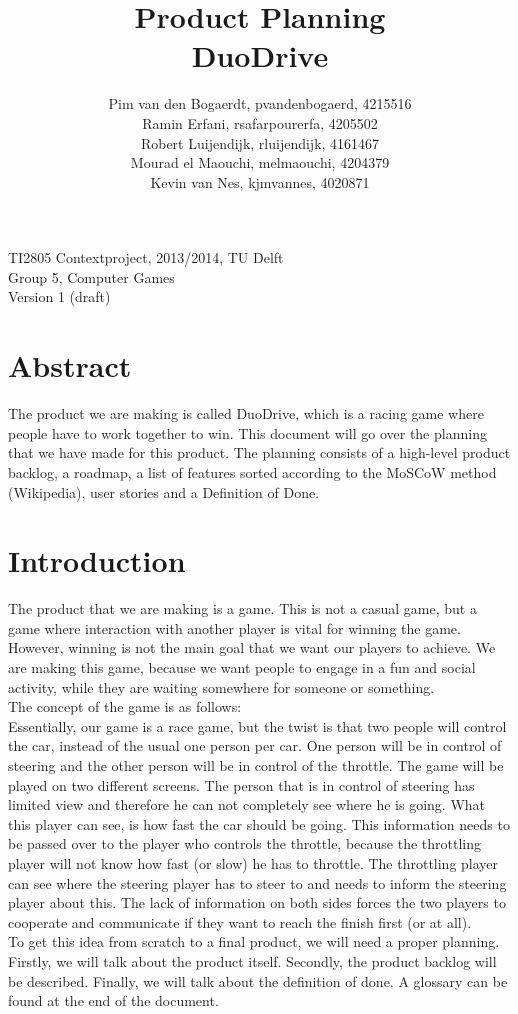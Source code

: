 \documentclass[11pt,twoside,a4paper]{article}
\title{
  Product Planning\\
  DuoDrive
}
\author{
	Pim van den Bogaerdt, pvandenbogaerd, 4215516\\
	Ramin Erfani, rsafarpourerfa, 4205502\\
	Robert Luijendijk, rluijendijk, 4161467\\
	Mourad el Maouchi, melmaouchi, 4204379\\
	Kevin van Nes, kjmvannes, 4020871
}
\begin{document}
\maketitle

\begin{center}
TI2805 Contextproject, 2013/2014, TU Delft\\
Group 5, Computer Games\\
Version 1 (draft)
\end{center}

\newpage

\section*{Abstract}
The product we are making is called DuoDrive, which is a racing game where people have to work together to win. This document will go over the planning that we have made for this product. The planning consists of a high-level product backlog, a roadmap, a list of features sorted according to the MoSCoW method (Wikipedia), user stories and a Definition of Done.

\newpage

\tableofcontents

\newpage

\section{Introduction}
The product that we are making is a game. This is not a casual game, but a game where interaction with another player is vital for winning the game. However, winning is not the main goal that we want our players to achieve. We are making this game, because we want people to engage in a fun and social activity, while they are waiting somewhere for someone or something.\\
The concept of the game is as follows:\\
Essentially, our game is a race game, but the twist is that two people will control the car, instead of the usual one person per car. One person will be in control of steering and the other person will be in control of the throttle. The game will be played on two different screens. The person that is in control of steering has limited view and therefore he can not completely see where he is going. What this player can see, is how fast the car should be going. This information needs to be passed over to the player who controls the throttle, because the throttling player will not know how fast (or slow) he has to throttle. The throttling player can see where the steering player has to steer to and needs to inform the steering player about this. The lack of information on both sides forces the two players to cooperate and communicate if they want to reach the finish first (or at all).\\
To get this idea from scratch to a final product, we will need a proper planning. Firstly, we will talk about the product itself. Secondly, the product backlog will be described. Finally, we will talk about the definition of done. A glossary can be found at the end of the document.
\end{document}
